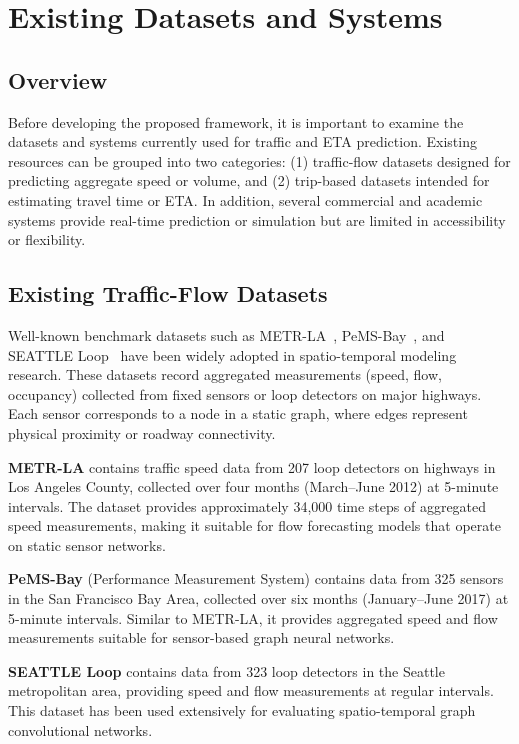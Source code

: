 \section{Existing Datasets and Systems}

\subsection{Overview}

Before developing the proposed framework, it is important to examine the datasets and systems currently used for traffic and ETA prediction. Existing resources can be grouped into two categories: (1) traffic-flow datasets designed for predicting aggregate speed or volume, and (2) trip-based datasets intended for estimating travel time or ETA. In addition, several commercial and academic systems provide real-time prediction or simulation but are limited in accessibility or flexibility.

\subsection{Existing Traffic-Flow Datasets}

Well-known benchmark datasets such as METR-LA~\cite{METR-LA}, PeMS-Bay~\cite{dcrnn2018}, and SEATTLE Loop~\cite{cui2019seattle} have been widely adopted in spatio-temporal modeling research. These datasets record aggregated measurements (speed, flow, occupancy) collected from fixed sensors or loop detectors on major highways. Each sensor corresponds to a node in a static graph, where edges represent physical proximity or roadway connectivity.

\textbf{METR-LA} contains traffic speed data from 207 loop detectors on highways in Los Angeles County, collected over four months (March–June 2012) at 5-minute intervals. The dataset provides approximately 34,000 time steps of aggregated speed measurements, making it suitable for flow forecasting models that operate on static sensor networks.

\textbf{PeMS-Bay} (Performance Measurement System) contains data from 325 sensors in the San Francisco Bay Area, collected over six months (January–June 2017) at 5-minute intervals. Similar to METR-LA, it provides aggregated speed and flow measurements suitable for sensor-based graph neural networks.

\textbf{SEATTLE Loop} contains data from 323 loop detectors in the Seattle metropolitan area, providing speed and flow measurements at regular intervals. This dataset has been used extensively for evaluating spatio-temporal graph convolutional networks.

